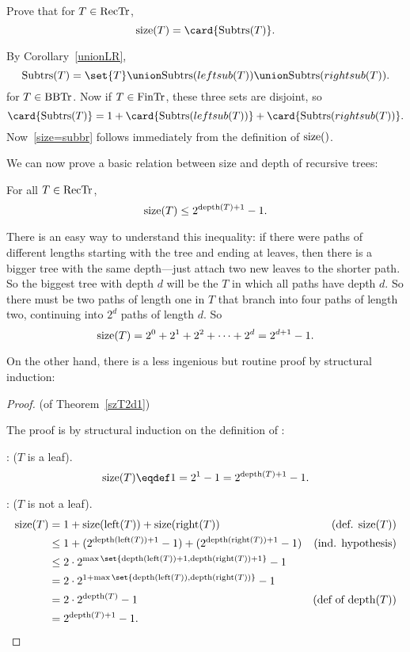 \begin{problem} Prove that for $T \in \text{RecTr}$, 
\begin{equation}\label{size=subbr}
\sizetr{T} = \card{\subbrn{T}}.
\end{equation}


\begin{solution}
By Corollary~\ref{unionLR},
\[
\subbrn{T} = \set{T} \union \subbrn{leftsub{(T)}} \union \subbrn{rightsub{(T)}}.
\]
for $T \in \text{BBTr}$.  Now if $T \in \text{FinTr}$, these three sets are disjoint, so
\[
\card{\subbrn{T}} = 1 + \card{\subbrn{leftsub{(T)}}} + \card{\subbrn{rightsub{(T)}}}.
\]
Now~\eqref{size=subbr} follows immediately from the definition of $\sizetr$.
\end{solution}
\end{problem}


We can now prove a basic relation between size and depth of recursive
trees:
                    \begin{theorem}\label{szT2d1}
For all $T \in \text{RecTr}$,
\[
\text{size}(T) \leq 2^{\text{depth}(T)+1} - 1.
\]
\end{theorem}

There is an easy way to understand this inequality: if there were
paths of different lengths starting with the tree and ending at
leaves, then there is a bigger tree with the same depth---just attach
two new leaves to the shorter path.  So the biggest tree with depth
$d$ will be the  $T$ in which all paths have depth
$d$.  So there must be two paths of length one in $T$ that branch into
four paths of length two, continuing into $2^d$ paths of length $d$.
So
\[
\text{size}(T) = 2^0 + 2^1 + 2^2 + \cdots + 2^d = 2^{d+1}-1.
\]

On the other hand, there is a less ingenious but routine proof by
structural induction:
\begin{proof} (of Theorem~\ref{szT2d1})

The proof is by structural induction on the definition of \rectr:

: ($T$ is a leaf).
\[
\sizetr{T} \eqdef 1 = 2^1 - 1 = 2^{\trdpth{T}+1} - 1.
\]

: ($T$ is not a leaf).
\begin{align*}
\sizetr{T}
& = 1 + \sizetr{\leftsub{(T)}} + \sizetr{\rightsub{(T)}}
              & \text{(def. $\sizetr{T}$)}\\
& \leq 1 + (2^{\trdpth{\leftsub{(T)}}+1} -1)  + (2^{\trdpth{\rightsub{(T)}}+1} -1)
              & \text{(ind. hypothesis)}\\
& \leq  2\cdot 2^{\max\set{\trdpth{\leftsub{(T)}}+1,\trdpth{\rightsub{(T)}}+1}} - 1\\
& = 2\cdot 2^{1+\max\set{\trdpth{\leftsub{(T)}},\trdpth{\rightsub{(T)}}}} - 1\\
& = 2\cdot 2^{\trdpth{T}} - 1
              & \text{(def of $\trdpth{T}$)}\\
& =  2^{\trdpth{T}+1} - 1.
\end{align*}
\end{proof}

